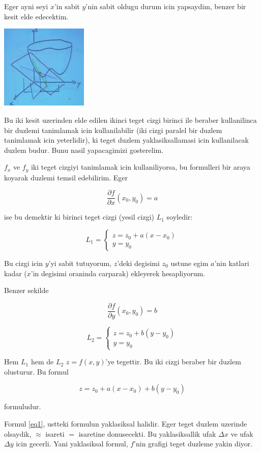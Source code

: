 \documentclass[12pt,fleqn]{article}
\begin{document}
Eger ayni seyi $x$'in sabit $y$'nin sabit oldugu durum icin yapsaydim,
benzer bir kesit elde edecektim. 

\includegraphics[height=4cm]{9_2.png}

Bu iki kesit uzerinden elde edilen ikinci teget cizgi birinci ile beraber
kullanilinca bir duzlemi tanimlamak icin kullanilabilir (iki cizgi paralel
bir duzlem tanimlamak icin yeterlidir), ki teget duzlem yaklasiksallamasi
icin kullanilacak duzlem budur. Bunu nasil yapacagimizi gosterelim.

$f_x$ ve $f_y$ iki teget cizgiyi tanimlamak icin kullaniliyorsa, bu
formulleri bir araya koyarak duzlemi temsil edebilirim. Eger

\[ \frac{\partial f}{\partial x}(x_0,y_0) = a \]

ise bu demektir ki birinci teget cizgi (yesil cizgi) $L_1$ soyledir:

\[ 
L_1 = 
\left\{ \begin{array}{l}
z = z_0 + a(x - x_0) \\
y = y_0
\end{array} \right.
 \]

Bu cizgi icin $y$'yi sabit tutuyorum, $z$'deki degisimi $z_0$ ustune egim
$a$'nin katlari kadar ($x$'in degisimi oraninda carparak) ekleyerek
hesapliyorum. 

Benzer sekilde

\[ \frac{\partial f}{\partial y}(x_0,y_0) = b \]

\[ 
L_2 = 
\left\{ \begin{array}{l}
z = z_0 + b(y - y_0) \\
y = y_0
\end{array} \right.
 \]

Hem $L_1$ hem de $L_2$ $z = f(x,y)$'ye tegettir. Bu iki cizgi beraber bir
duzlem olusturur. Bu formul

\begin{equation}\label{eq2}
z = z_0 + a(x-x_0) + b(y-y_0) 
\end{equation}

formuludur. 

Formul \ref{eq1}, ustteki formulun yaklasiksal halidir. Eger teget duzlem
uzerinde olsaydik, $\approx$ isareti $=$ isaretine donusecekti. Bu
yaklasiksallik ufak $\Delta x$ ve ufak $\Delta y$ icin gecerli. Yani
yaklasiksal formul, $f$'nin grafigi teget duzleme yakin diyor. 
\end{document}
